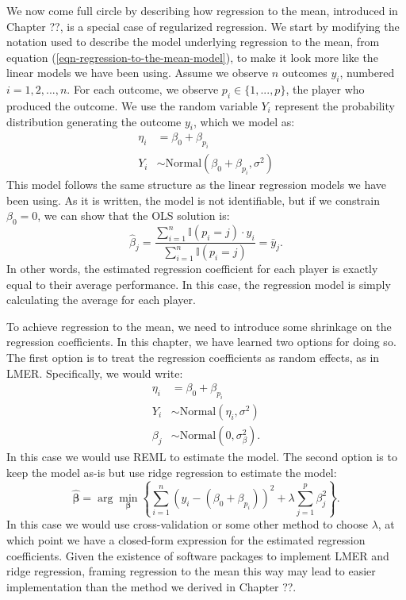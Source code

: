 \documentclass{article}
\begin{document}
  We now come full circle by describing how regression to the mean, introduced in Chapter ??, is a special case of regularized regression. We start by modifying the notation used to describe the model underlying regression to the mean, from equation (\ref{eqn-regression-to-the-mean-model}), to make it look more like the linear models we have been using. Assume we observe $n$ outcomes $y_i$, numbered $i = 1, 2, ..., n$. For each outcome, we observe $p_i \in \{1, ..., p\}$, the player who produced the outcome. We use the random variable $Y_i$ represent the probability distribution generating the outcome $y_i$, which we model as:
  \begin{align*}
    \eta_i &= \beta_0 + \beta_{p_i}\\
    Y_i &\sim \mbox{Normal}(\beta_0 + \beta_{p_i}, \sigma^2)
  \end{align*}
  This model follows the same structure as the linear regression models we have been using. As it is written, the model is not identifiable, but if we constrain $\beta_0 = 0$, we can show that the OLS solution is:
  \begin{equation*}
    \hat\beta_{j} = \frac{\sum_{i = 1}^n \mathbb{I}(p_i = j) \cdot y_i}{\sum_{i = 1}^n \mathbb{I}(p_i = j)} = \bar y_{j}.
  \end{equation*}
  In other words, the estimated regression coefficient for each player is exactly equal to their average performance. In this case, the regression model is simply calculating the average for each player.

  To achieve regression to the mean, we need to introduce some shrinkage on the regression coefficients. In this chapter, we have learned two options for doing so. The first option is to treat the regression coefficients as random effects, as in LMER. Specifically, we would write:
  \begin{equation*}
    \begin{split}
      \eta_i &= \beta_0 + \beta_{p_i}\\
      Y_i &\sim \mbox{Normal}(\eta_i, \sigma^2)\\
      \beta_j &\sim \mbox{Normal}(0, \sigma^2_\beta).
    \end{split}
  \end{equation*}
  In this case we would use REML to estimate the model. The second option is to keep the model as-is but use ridge regression to estimate the model:
  \begin{equation*}
    \boldsymbol{\hat\beta} = \arg\min_{\boldsymbol{\beta}} \left\{ \sum_{i=1}^n (y_i - (\beta_0 + \beta_{p_i}))^2 + \lambda \sum_{j = 1}^p \beta_j^2 \right\}.
  \end{equation*}
  In this case we would use cross-validation or some other method to choose $\lambda$, at which point we have a closed-form expression for the estimated regression coefficients. Given the existence of software packages to implement LMER and ridge regression, framing regression to the mean this way may lead to easier implementation than the method we derived in Chapter ??.
\end{document}
